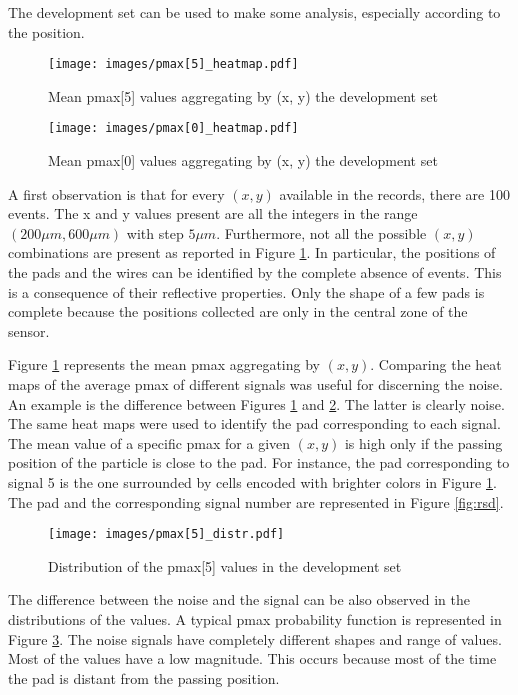 \documentclass[conference]{IEEEtran}
\begin{document}
The development set can be used to make some analysis, especially according to the position.\\
\begin{figure}[htbp]
\centerline{\texttt{[image: images/pmax[5]\_heatmap.pdf]}}
\caption{Mean pmax[5] values aggregating by (x, y) the development set}
\label{fig:pmax[5]_heatmap}
\end{figure}
\begin{figure}[htbp]
\centerline{\texttt{[image: images/pmax[0]\_heatmap.pdf]}}
\caption{Mean pmax[0] values aggregating by (x, y) the development set}
\label{fig:pmax[0]_heatmap}
\end{figure}
A first observation is that for every $(x, y)$ available in the records, there are 100 events. The x and y values present are all the integers in the range $(200 \mu m, 600 \mu m)$ with step $5 \mu m$. Furthermore, not all the possible $(x, y)$ combinations are present as reported in Figure 
\ref{fig:pmax[5]_heatmap}. In particular, the positions of the pads and the wires can be identified by the complete absence of events. This is a consequence of their reflective properties. Only the shape of a few pads is complete because the positions collected are only in the central zone of the sensor. 

Figure \ref{fig:pmax[5]_heatmap} represents the mean pmax aggregating by $(x, y)$. Comparing the heat maps of the average pmax of different signals was useful for discerning the noise. An example is the difference between Figures \ref{fig:pmax[5]_heatmap} and \ref{fig:pmax[0]_heatmap}. The latter is clearly noise. \\
The same heat maps were used to identify the pad corresponding to each signal. The mean value of a specific pmax for a given $(x, y)$ is high only if the passing position of the particle is close to the pad. For instance, the pad corresponding to signal 5 is the one surrounded by cells encoded with brighter colors in Figure \ref{fig:pmax[5]_heatmap}.
The pad and the corresponding signal number are represented in Figure \ref{fig:rsd}.\\

\begin{figure}[htbp]
\centerline{\texttt{[image: images/pmax[5]\_distr.pdf]}}
\caption{Distribution of the pmax[5] values in the development set}
\label{fig:pmax[5]_distr}
\end{figure}
The difference between the noise and the signal can be also observed in the distributions of the values. A typical pmax probability function is represented in Figure \ref{fig:pmax[5]_distr}. The noise signals have completely different shapes and range of values. Most of the values have a low magnitude. This occurs because most of the time the pad is distant from the passing position.\\
\end{document}
